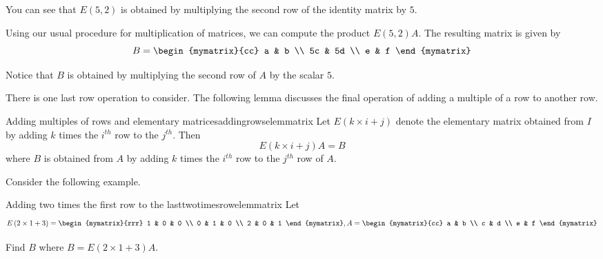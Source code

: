 \begin{solution}
You can see that $E \left(5, 2\right)$ is obtained by multiplying the second row 
of the identity matrix by $5$.

Using our usual procedure for multiplication of matrices, we can compute the product $E \left(5, 2\right)A$. The 
resulting matrix is given by 
\begin{equation*}
B
=\begin{mymatrix}{cc}
a & b \\
5c & 5d \\
e & f
\end{mymatrix}
\end{equation*}

Notice that $B$ is obtained by multiplying the second row of $A$ by the scalar $5$. 
\end{solution}

There is one last row operation to consider. The following lemma discusses the final
operation of adding a multiple of a row to another row.

\begin{lemma}{Adding multiples of rows and elementary matrices}{addingrowselemmatrix}
Let $E\left( k \times i+j\right) $ denote the elementary
matrix obtained from $I$ by adding $k$ times the $i^{th}$ row to the $j^{th}$. Then
\begin{equation*}
E\left( k \times i+j\right) A=B
\end{equation*}
where $B$ is obtained from $A$ by adding $k$ times the $i^{th}$ row to the $j^{th}$ row of $A.$
\end{lemma}

Consider the following example.

\begin{example}{Adding two times the first row to the last}{twotimesrowelemmatrix}
Let
\begin{equation*}
E\left( 2 \times 1+3\right) = \begin{mymatrix}{rrr}
1 & 0 & 0 \\
0 & 1 & 0 \\
2 & 0 & 1
\end{mymatrix}, A =  \begin{mymatrix}{cc}
a & b \\
c & d \\
e & f
\end{mymatrix} 
\end{equation*}

Find $B$ where $B = E\left( 2 \times 1+3\right)A$.
\end{example}

